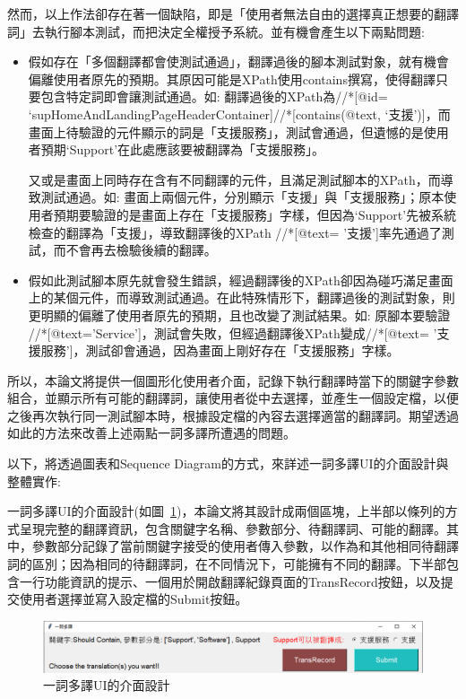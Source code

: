 然而，以上作法卻存在著一個缺陷，即是「使用者無法自由的選擇真正想要的翻譯詞」去執行腳本測試，而把決定全權授予系統。並有機會產生以下兩點問題:
\begin{itemize}
\item[1.]假如存在「多個翻譯都會使測試通過」，翻譯過後的腳本測試對象，就有機會偏離使用者原先的預期。其原因可能是XPath使用contains撰寫，使得翻譯只要包含特定詞即會讓測試通過。如: 翻譯過後的XPath為//*[@id= ‘supHomeAndLandingPageHeaderContainer]//*[contains(@text, ‘支援’)]，而畫面上待驗證的元件顯示的詞是「支援服務」，測試會通過，但遺憾的是使用者預期‘Support’在此處應該要被翻譯為「支援服務」。
 
\hspace{5mm} 又或是畫面上同時存在含有不同翻譯的元件，且滿足測試腳本的XPath，而導致測試通過。如: 畫面上兩個元件，分別顯示「支援」與「支援服務」；原本使用者預期要驗證的是畫面上存在「支援服務」字樣，但因為‘Support’先被系統檢查的翻譯為「支援」，導致翻譯後的XPath //*[@text= '支援']率先通過了測試，而不會再去檢驗後續的翻譯。 
\item[2.]假如此測試腳本原先就會發生錯誤，經過翻譯後的XPath卻因為碰巧滿足畫面上的某個元件，而導致測試通過。在此特殊情形下，翻譯過後的測試對象，則更明顯的偏離了使用者原先的預期，且也改變了測試結果。如: 原腳本要驗證 //*[@text='Service']，測試會失敗，但經過翻譯後XPath變成//*[@text= '支援服務']，測試卻會通過，因為畫面上剛好存在「支援服務」字樣。
\end{itemize}

所以，本論文將提供一個圖形化使用者介面，記錄下執行翻譯時當下的關鍵字參數組合，並顯示所有可能的翻譯詞，讓使用者從中去選擇，並產生一個設定檔，以便之後再次執行同一測試腳本時，根據設定檔的內容去選擇適當的翻譯詞。期望透過如此的方法來改善上述兩點一詞多譯所遭遇的問題。

以下，將透過圖表和Sequence Diagram的方式，來詳述一詞多譯UI的介面設計與整體實作:

一詞多譯UI的介面設計(如圖~\ref{一詞多譯UI的介面設計})，本論文將其設計成兩個區塊，上半部以條列的方式呈現完整的翻譯資訊，包含關鍵字名稱、參數部分、待翻譯詞、可能的翻譯。其中，參數部分記錄了當前關鍵字接受的使用者傳入參數，以作為和其他相同待翻譯詞的區別；因為相同的待翻譯詞，在不同情況下，可能擁有不同的翻譯。下半部包含一行功能資訊的提示、一個用於開啟翻譯紀錄頁面的TransRecord按鈕，以及提交使用者選擇並寫入設定檔的Submit按鈕。
\begin{figure}[H]
    \centering
    \includegraphics[width= 1.1\textwidth]{../論文截圖/3-4-1一詞多譯UI介面設計.png}
    \caption{一詞多譯UI的介面設計}
    \label{一詞多譯UI的介面設計}
\end{figure}

